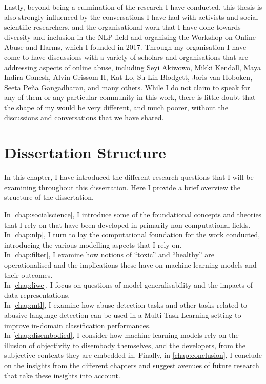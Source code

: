 {Lastly, beyond being a culmination of the research I have conducted, this thesis is also strongly influenced by the conversations I have had with activists and social scientific researchers, and the organisational work that I have done towards diversity and inclusion in the NLP field and organising the Workshop on Online Abuse and Harms, which I founded in 2017.
Through my organisation I have come to have discussions with a variety of scholars and organisations that are addressing aspects of online abuse, including Seyi Akiwowo, Mikki Kendall, Maya Indira Ganesh, Alvin Grissom II, Kat Lo, Su Lin Blodgett, Joris van Hoboken, Seeta Pe{\~n}a Gangadharan, and many others.
While I do not claim to speak for any of them or any particular community in this work, there is little doubt that the shape of my would be very different, and much poorer, without the discussions and conversations that we have shared.
}
\section{Dissertation Structure}\label{sec:structure}

In this chapter, I have introduced the different research questions that I will be examining throughout this dissertation. Here I provide a brief overview the structure of the dissertation.

In \cref{chap:socialscience}, I introduce some of the foundational concepts and theories that I rely on that have been developed in primarily non-computational fields.\\
In \cref{chap:nlp}, I turn to lay the computational foundation for the work conducted, introducing the various modelling aspects that I rely on.\\
In \cref{chap:filter}, I examine how notions of ``toxic'' and ``healthy'' are operationalised and the implications these have on machine learning models and their outcomes.\\
In \cref{chap:liwc}, I focus on questions of model generalisability and the impacts of data representations.\\
In \cref{chap:mtl}, I examine how abuse detection tasks and other tasks related to abusive language detection can be used in a Multi-Task Learning setting to improve in-domain classification performances.\\
In \cref{chap:disembodied}, I consider how machine learning models rely on the illusion of objectivity to disembody themselves, and the developers, from the subjective contexts they are embedded in.
Finally, in \cref{chap:conclusion}, I conclude on the insights from the different chapters and suggest avenues of future research that take these insights into account.


